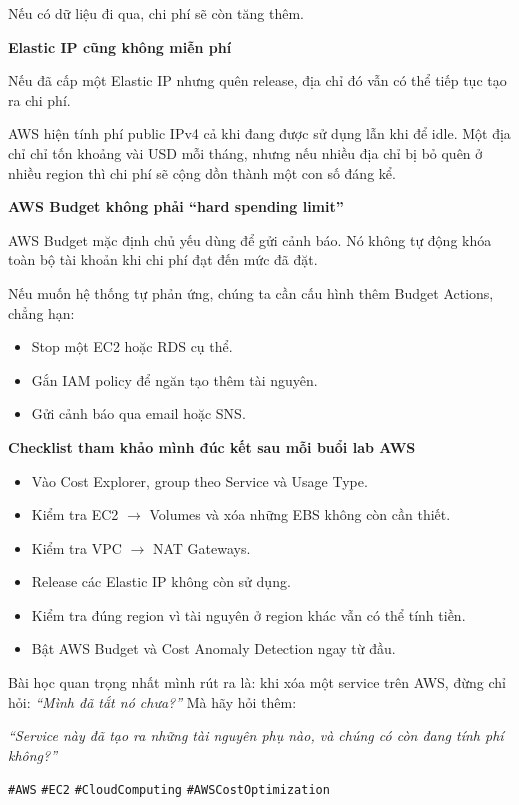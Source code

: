 Nếu có dữ liệu đi qua, chi phí sẽ còn tăng thêm.

\vspace{0.5em}\noindent\textbf{Elastic IP cũng không miễn
phí}\par

Nếu đã cấp một Elastic IP nhưng quên release, địa chỉ đó vẫn có thể tiếp
tục tạo ra chi phí.

AWS hiện tính phí public IPv4 cả khi đang được sử dụng lẫn khi để idle.
Một địa chỉ chỉ tốn khoảng vài USD mỗi tháng, nhưng nếu nhiều địa chỉ bị
bỏ quên ở nhiều region thì chi phí sẽ cộng dồn thành một con số đáng kể.

\vspace{0.5em}\noindent\textbf{AWS Budget không phải ``hard spending
limit''}\par

AWS Budget mặc định chủ yếu dùng để gửi cảnh báo. Nó không tự động khóa
toàn bộ tài khoản khi chi phí đạt đến mức đã đặt.

Nếu muốn hệ thống tự phản ứng, chúng ta cần cấu hình thêm Budget
Actions, chẳng hạn:

\begin{itemize}
\tightlist
\item
  Stop một EC2 hoặc RDS cụ thể.
\item
  Gắn IAM policy để ngăn tạo thêm tài nguyên.
\item
  Gửi cảnh báo qua email hoặc SNS.
\end{itemize}

\vspace{0.5em}\noindent\textbf{Checklist tham khảo mình đúc kết sau mỗi buổi lab
AWS}\par

\begin{itemize}
\tightlist
\item
  Vào Cost Explorer, group theo Service và Usage Type.
\item
  Kiểm tra EC2 \(\rightarrow\) Volumes và xóa những EBS không còn cần
  thiết.
\item
  Kiểm tra VPC \(\rightarrow\) NAT Gateways.
\item
  Release các Elastic IP không còn sử dụng.
\item
  Kiểm tra đúng region vì tài nguyên ở region khác vẫn có thể tính tiền.
\item
  Bật AWS Budget và Cost Anomaly Detection ngay từ đầu.
\end{itemize}

Bài học quan trọng nhất mình rút ra là: khi xóa một service trên AWS,
đừng chỉ hỏi: \emph{``Mình đã tắt nó chưa?''} Mà hãy hỏi thêm:

\emph{``Service này đã tạo ra những tài nguyên phụ nào, và chúng có còn
đang tính phí không?''}

\texttt{\#AWS} \texttt{\#EC2} \texttt{\#CloudComputing}
\texttt{\#AWSCostOptimization}
